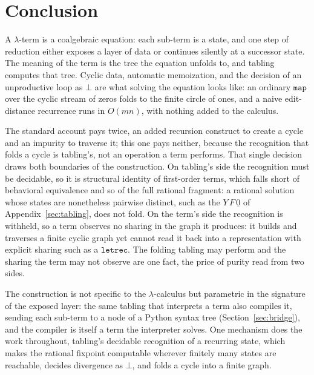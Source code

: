 \section{Conclusion}\label{sec:conclusion}
A $\lambda$-term is a coalgebraic equation: each sub-term is a state, and one step of reduction either exposes a layer of data or continues silently at a successor state. The meaning of the term is the tree the equation unfolds to, and tabling computes that tree. Cyclic data, automatic memoization, and the decision of an unproductive loop as $\bot$ are what solving the equation looks like: an ordinary $\mathtt{map}$ over the cyclic stream of zeros folds to the finite circle of ones, and a naive edit-distance recurrence runs in $O(mn)$, with nothing added to the calculus.

The standard account pays twice, an added recursion construct to create a cycle and an impurity to traverse it; this one pays neither, because the recognition that folds a cycle is tabling's, not an operation a term performs. That single decision draws both boundaries of the construction. On tabling's side the recognition must be decidable, so it is structural identity of first-order terms, which falls short of behavioral equivalence and so of the full rational fragment: a rational solution whose states are nonetheless pairwise distinct, such as the $Y\,F\,\underline{0}$ of Appendix~\ref{sec:tabling}, does not fold. On the term's side the recognition is withheld, so a term observes no sharing in the graph it produces: it builds and traverses a finite cyclic graph yet cannot read it back into a representation with explicit sharing such as a $\mathtt{letrec}$. The folding tabling may perform and the sharing the term may not observe are one fact, the price of purity read from two sides.

The construction is not specific to the $\lambda$-calculus but parametric in the signature of the exposed layer: the same tabling that interprets a term also compiles it, sending each sub-term to a node of a Python syntax tree (Section~\ref{sec:bridge}), and the compiler is itself a term the interpreter solves. One mechanism does the work throughout, tabling's decidable recognition of a recurring state, which makes the rational fixpoint computable wherever finitely many states are reachable, decides divergence as $\bot$, and folds a cycle into a finite graph.

